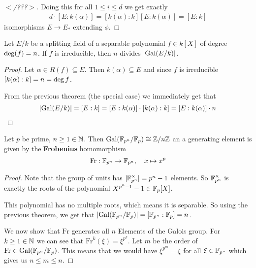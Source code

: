 \begin{proof}
  [$<$/???$>$]

  Doing this for all $1 \leq i \leq d$ we get exactly 
  \begin{align*}
    d \cdot [E:k(\alpha)] = [k(\alpha):k][E:k(\alpha)] = [E:k]
  \end{align*}
  isomorphisms $E \to  E_{\ast}$ extending $\phi$.
\end{proof}


\begin{cor}[Rotman 3.9] \label{cor:rot3-9}
  Let $E/k$ be a splitting field of a separable polynomial $f \in k[X]$ of degree $\operatorname{deg}(f) =n$.
  If $f$ is irreducible, then $n$ divides $\abs{\Gal(E/k)}$.
\end{cor}
\begin{proof}
  Let $\alpha \in R(f) \subseteq E$. Then $k(\alpha) \subseteq E$ and since $f$ is irreducible $[k(\alpha):k] = n = \operatorname{deg} f$.

  From the previous theorem (the special case) we immediately get that
  \begin{align*}
    \abs{\Gal(E/k)} = [E:k] = [E:k(\alpha)]\cdot [k(\alpha):k]= [E:k(\alpha)] \cdot n
  \end{align*}
\end{proof}

\begin{thm}[Rotman 3.15]
Let $p$ be prime, $n \geq 1 \in \mathbb{N}$.
Then $\operatorname{Gal}(\mathbb{F}_{p^{n}}/\mathbb{F}_p) \cong \mathbb{Z}/n\mathbb{Z}$ an a generating element is given by the \textbf{Frobenius} homomorphism
\begin{align*}
  \text{Fr}: \mathbb{F}_{p^{n}} \to \mathbb{F}_{p^{n}}, \quad x \mapsto  x^{p}
\end{align*}
\end{thm}
\begin{proof}
Note that the group of units has $\vert\mathbb{F}_{p^{n}}^{\times}\vert = p^{n}-1$ elements. So $\mathbb{F}_{p^{n}}^{\times}$ is exactly the roots of the polynomial $X^{p^{n} -1} - 1 \in \mathbb{F}_{p}[X]$.

This polynomial has no multiple roots, which means it is separable. So using the previous theorem, we get that $\abs{\Gal(\F_{p^{n}}/\F_p)} = [\F_{p^{n}}: \F_p] = n$.

We now show that $\text{Fr}$ generates all $n$ Elements of the Galois group.
For $k \geq 1 \in \mathbb{N}$ we can see that $\text{Fr}^{k}(\xi) = \xi^{p^{k}}$. 
Let $m$ be the order of $\text{Fr} \in \operatorname{Gal}(\mathbb{F}_{p^{n}}/\mathbb{F}_p)$. 
This means that we would have $\xi^{p^{m}} = \xi$ for all $\xi \in \mathbb{F}_{p^{n}}$ which gives us $n \leq m \leq n$.
\end{proof}


